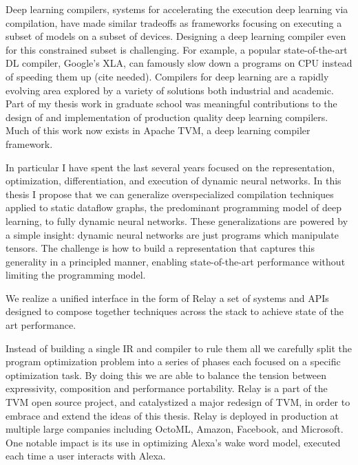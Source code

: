 Deep learning compilers, systems for accelerating the execution deep learning via compilation,
 have made similar tradeoffs as frameworks focusing on executing a subset of models on a subset of devices.
Designing a deep learning compiler even for this constrained subset is challenging.
For example,
  a popular state-of-the-art DL compiler,
  Google's XLA, can famously slow down a programs on
  CPU instead of speeding them up (cite needed).
Compilers for deep learning are a rapidly evolving area explored by a
  variety of solutions both industrial and academic.
Part of my thesis work in graduate school
  was meaningful contributions to the design of and implementation of
  production quality deep learning compilers.
Much of this work now exists in Apache TVM, a deep learning compiler framework.

In particular I have spent the last several years focused on the
  representation,
  optimization,
  differentiation,
  and execution of dynamic neural networks.
In this thesis I propose that we can generalize overspecialized
  compilation techniques applied to static dataflow graphs,
  the predominant programming model of deep learning,
  to fully dynamic neural networks.
These generalizations are powered by a simple insight:
  dynamic neural networks are just programs which manipulate tensors.
The challenge is how to build a representation that captures this generality
  in a principled manner, enabling state-of-the-art performance without limiting the programming model.

We realize a unified interface in the form of Relay a set of systems and APIs designed
  to compose together techniques across the stack to achieve state of the art performance.

Instead of building a single IR and compiler to rule them all we carefully split
  the program optimization problem into a series of phases each focused on a specific
  optimization task.
By doing this we are able to balance the tension between expressivity, composition
  and performance portability.
Relay is a part of the TVM open source project, and catalystized a major redesign of
  TVM, in order to embrace and extend the ideas of this thesis.
Relay is deployed in production at multiple large companies including
  OctoML, Amazon, Facebook, and Microsoft.
One notable impact is its use in
  optimizing Alexa’s wake word model, executed each time a user interacts with
  Alexa.

